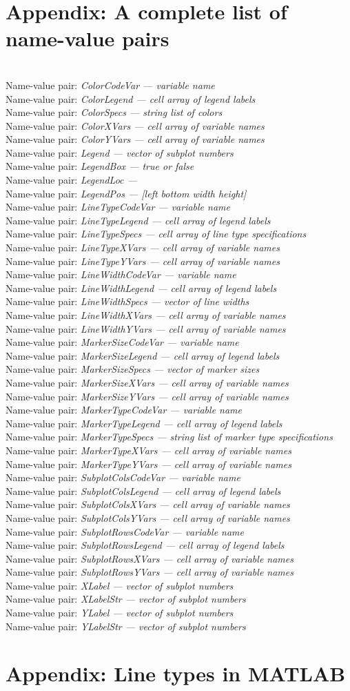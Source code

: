 \documentclass{article}
\newcommand{\namevalue}[2]{\mbox{ } \\ Name-value pair: {\it #1 --- #2}}
\begin{document}
\appendix

\section{Appendix: A complete list of name-value pairs}

\namevalue{ColorCodeVar}{variable name}
\namevalue{ColorLegend}{cell array of legend labels}
\namevalue{ColorSpecs}{string list of colors}
\namevalue{ColorXVars}{cell array of variable names}
\namevalue{ColorYVars}{cell array of variable names}
\namevalue{Legend}{vector of subplot numbers}
\namevalue{LegendBox}{true or false}
\namevalue{LegendLoc}{}
\namevalue{LegendPos}{[left bottom width height]}
\namevalue{LineTypeCodeVar}{variable name}
\namevalue{LineTypeLegend}{cell array of legend labels}
\namevalue{LineTypeSpecs}{cell array of line type specifications}
\namevalue{LineTypeXVars}{cell array of variable names}
\namevalue{LineTypeYVars}{cell array of variable names}
\namevalue{LineWidthCodeVar}{variable name}
\namevalue{LineWidthLegend}{cell array of legend labels}
\namevalue{LineWidthSpecs}{vector of line widths}
\namevalue{LineWidthXVars}{cell array of variable names}
\namevalue{LineWidthYVars}{cell array of variable names}
\namevalue{MarkerSizeCodeVar}{variable name}
\namevalue{MarkerSizeLegend}{cell array of legend labels}
\namevalue{MarkerSizeSpecs}{vector of marker sizes}
\namevalue{MarkerSizeXVars}{cell array of variable names}
\namevalue{MarkerSizeYVars}{cell array of variable names}
\namevalue{MarkerTypeCodeVar}{variable name}
\namevalue{MarkerTypeLegend}{cell array of legend labels}
\namevalue{MarkerTypeSpecs}{string list of marker type specifications}
\namevalue{MarkerTypeXVars}{cell array of variable names}
\namevalue{MarkerTypeYVars}{cell array of variable names}
\namevalue{SubplotColsCodeVar}{variable name}
\namevalue{SubplotColsLegend}{cell array of legend labels}
\namevalue{SubplotColsXVars}{cell array of variable names}
\namevalue{SubplotColsYVars}{cell array of variable names}
\namevalue{SubplotRowsCodeVar}{variable name}
\namevalue{SubplotRowsLegend}{cell array of legend labels}
\namevalue{SubplotRowsXVars}{cell array of variable names}
\namevalue{SubplotRowsYVars}{cell array of variable names}
\namevalue{XLabel}{vector of subplot numbers}
\namevalue{XLabelStr}{vector of subplot numbers}
\namevalue{YLabel}{vector of subplot numbers}
\namevalue{YLabelStr}{vector of subplot numbers}

\section{Appendix: Line types in MATLAB}
\end{document}
